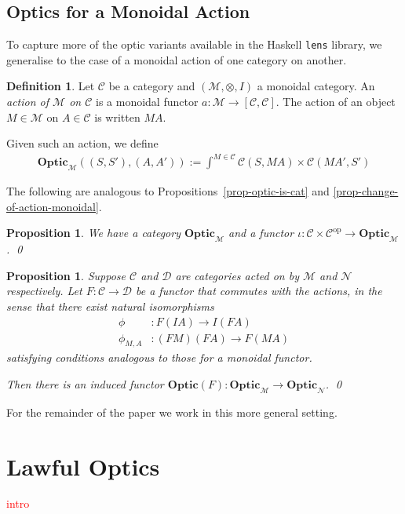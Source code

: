 \documentclass[11pt,a4paper]{article}
\theoremstyle{plain}
\newtheorem{proposition}[theorem]{Proposition}
\theoremstyle{definition}
\newtheorem{definition}[theorem]{Definition}
\newcommand{\C}{\mathscr{C}}
\newcommand{\D}{\mathscr{D}}
\newcommand{\M}{\mathscr{M}}
\newcommand{\N}{\mathscr{N}}
\newcommand{\lenslib}{\texttt{lens}}
\newcommand{\Optic}{\mathbf{Optic}}
\newcommand{\op}{\mathrm{op}}
\newcommand{\todo}[1]{\textcolor{red}{\small #1}}
\begin{document}
\subsection{Optics for a Monoidal Action}

To capture more of the optic variants available in the Haskell \lenslib{} library, we generalise to the case of a monoidal action of one category on another.

\begin{definition}
  Let $\C$ be a category and $(\M, \otimes, I)$ a monoidal category. An \emph{action of $\M$ on $\C$} is a monoidal functor $a : \M \to [\C, \C]$. The action of an object $M \in \M$ on $A \in \C$ is written $MA$.
\end{definition}

Given such an action, we define
\begin{align*}
  \Optic_\M((S, S'), (A, A')) := \int^{M \in \C} \C(S, MA) \times \C(MA', S')
\end{align*}

The following are analogous to Propositions~\ref{prop-optic-is-cat} and \ref{prop-change-of-action-monoidal}.

\begin{proposition}
  We have a category $\Optic_\M$ and a functor $\iota : \C \times \C^\op \to \Optic_\M$. \qed
\end{proposition}

\begin{proposition}\label{prop-change-of-action}
  Suppose $\C$ and $\D$ are categories acted on by $\M$ and $\mathcal{N}$ respectively. Let $F : \C \to \D$ be a functor that commutes with the actions, in the sense that there exist natural isomorphisms
  \begin{align*}
  \phi &: F(IA) \to I(FA) \\
  \phi_{M,A} &: (FM)(FA) \to F(MA)
  \end{align*}
satisfying conditions analogous to those for a monoidal functor.
  
Then there is an induced functor $\Optic(F) : \Optic_\M \to \Optic_\N$. \qed
\end{proposition}

For the remainder of the paper we work in this more general setting.

\section{Lawful Optics}\label{sec:lawful-optics}
\todo{intro}
\end{document}
